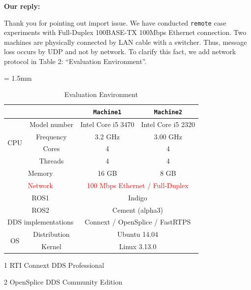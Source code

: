 \documentclass{article}
\begin{document}
\begin{enumerate}
  \begin{flushleft}
    \textbf{Our reply:}
  \end{flushleft}
  Thank you for pointing out import issue. 
  We have conducted \texttt{remote} case experiments with Full-Duplex 100BASE-TX 100Mbps Ethernet connection.
  Two machines are physically connected by LAN cable with a switcher.
  Thus, message loss occurs by UDP and not by network.
  To clarify this fact, we add network protocol in Table 2: ``Evaluation Environment''.
  \setcounter{table}{1}
  \begin{table}[htb]
    \caption{Evaluation Environment} 
    \centering
    \begin{threeparttable}
      \renewcommand{\arraystretch}{1.0}
      \label{tb:environment}
      \small
      \tabcolsep = 1.5mm              %
      \begin{tabular}{c|c||c|c}
        \hline
        \multicolumn{2}{c||}{ } & \textbf{\texttt{Machine1}} & \textbf{\texttt{Machine2}} \\ \hline \hline
        \multirow{4}{*}{CPU}   & Model number & Intel Core i5 3470 & Intel Core i5 2320 \\ 
        & Frequency & 3.2 GHz & 3.00 GHz \\ 
        & Cores & 4 & 4 \\ 
        & Threads & 4 & 4 \\ \hline
        \multicolumn{2}{c||}{Memory} & 16 GB & 8 GB \\ \hline 
        \multicolumn{2}{c||}{\textcolor{red}{Network}} & \multicolumn{2}{c}{\textcolor{red}{100 Mbps Ethernet / Full-Duplex}} \\ \hline
        \multicolumn{2}{c||}{ROS1} & \multicolumn{2}{c}{Indigo} \\ 
        \multicolumn{2}{c||}{ROS2} & \multicolumn{2}{c}{Cement (alpha3)} \\ 
        \multicolumn{2}{c||}{DDS implementations} & \multicolumn{2}{c}{Connext\tnote{1} / OpenSplice\tnote{2} / FastRTPS } \\ \hline 
        \multirow{2}{*}{OS} & Distribution & \multicolumn{2}{c}{Ubuntu 14.04} \\ 
        & Kernel & \multicolumn{2}{c}{Linux 3.13.0} \\ \hline
      \end{tabular}
      \begin{tablenotes}
      \item[1] RTI Connext DDS Professional \cite{rti_connext}
      \item[2] OpenSplice DDS Community Edition \cite{ospl_dds_community}
      \end{tablenotes}
    \end{threeparttable}
  \end{table}
  

\end{enumerate}
\end{document}
